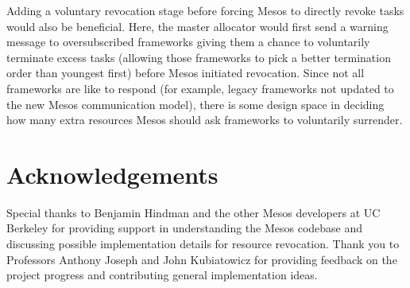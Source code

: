 Adding a voluntary revocation stage before forcing Mesos to directly revoke tasks would also be
beneficial. Here, the master allocator would first send a warning message to oversubscribed frameworks
giving them a chance to voluntarily terminate excess tasks (allowing those frameworks to pick a better
termination order than youngest first) before Mesos initiated revocation. Since not all frameworks are
like to respond (for example, legacy frameworks not updated to the new Mesos communication model), there
is some design space in deciding how many extra resources Mesos should ask frameworks to voluntarily
surrender.

\section{Acknowledgements}
Special thanks to Benjamin Hindman and the other Mesos developers at UC Berkeley for providing support in
understanding the Mesos codebase and discussing possible implementation details for resource revocation.
Thank you to Professors Anthony Joseph and John Kubiatowicz for providing feedback on the project
progress and contributing general implementation ideas.
